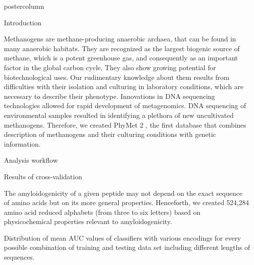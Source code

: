 \documentclass[final]{beamer}
\makeatletter
\def\maxwidth{ %
  \ifdim\Gin@nat@width>\linewidth
    \linewidth
  \else
    \Gin@nat@width
  \fi
}
\newenvironment{knitrout}{}{} %
\newlength{\columnheight}
\makeatother
\begin{document}
\begin{frame}
\begin{columns}
\begin{column}{.53\textwidth}
\begin{beamercolorbox}[center,wd=\textwidth]{postercolumn}
\begin{minipage}[T]{.95\textwidth}
\parbox[t][\columnheight]{\textwidth}
{
\begin{block}{Introduction}

Methanogens are methane-producing anaerobic archaea, that can be found in many anaerobic habitats. They are recognized as the largest biogenic source of methane, which is a potent greenhouse gas, and consequently as an important factor in the global carbon cycle. They also show growing potential for biotechnological uses. Our rudimentary knowledge about them results from difficulties with their isolation and culturing in laboratory conditions, which are necessary to describe their phenotype. Innovations in DNA sequencing technologies allowed for rapid development of metagenomics. DNA sequencing of environmental samples resulted in identifying a plethora of new uncultivated methanogens. Therefore, we created PhyMet 2 , the first database that combines description of methanogens and their culturing conditions with genetic information.

\end{block}

\begin{block}{Analysis workflow}
\begin{figure} 
\end{figure}

    \end{block}


\begin{block}{Results of cross-validation}

The amyloidogenicity of a given peptide may not depend on the exact sequence of 
amino acids but on its more general properties. 
Henceforth, we created 524,284 amino acid reduced alphabets (from three to six letters) based on physicochemical properties relevant to amyloidogenicity. 

Distribution of mean AUC values of classifiers with various encodings 
for every possible combination of training and testing data set including 
different lengths of sequences. 

% 
% 
% 
% 
% 


\end{block}}
\end{minipage}
\end{beamercolorbox}
\end{column}
\end{columns}
\end{frame}
\end{document}
